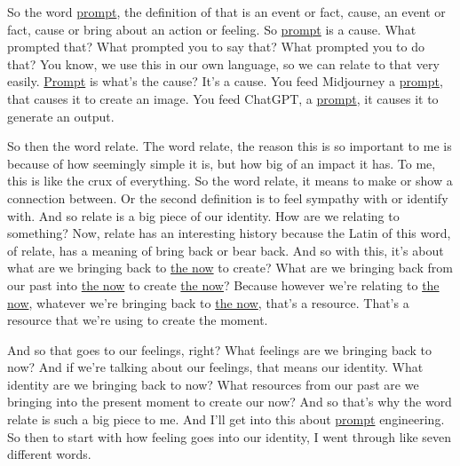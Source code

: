 \documentclass{article}
\begin{document}
So the word \hyperlink{gloss:prompt}{prompt}, the definition of that is an event or fact, cause, an event or fact, cause or bring about an action or feeling. So \hyperlink{gloss:prompt}{prompt} is a cause. What prompted that? What prompted you to say that? What prompted you to do that? You know, we use this in our own language, so we can relate to that very easily. \hyperlink{gloss:prompt}{Prompt} is what's the cause? It's a cause. You feed Midjourney a \hyperlink{gloss:prompt}{prompt}, that causes it to create an image. You feed ChatGPT, a \hyperlink{gloss:prompt}{prompt}, it causes it to generate an output.

So then the word relate. The word relate, the reason this is so important to me is because of how seemingly simple it is, but how big of an impact it has. To me, this is like the crux of everything. So the word relate, it means to make or show a connection between. Or the second definition is to feel sympathy with or identify with. And so relate is a big piece of our identity. How are we relating to something? Now, relate has an interesting history because the Latin of this word, of relate, has a meaning of bring back or bear back. And so with this, it's about what are we bringing back to \hyperlink{gloss:the_now}{the now} to create? What are we bringing back from our past into \hyperlink{gloss:the_now}{the now} to create \hyperlink{gloss:the_now}{the now}? Because however we're relating to \hyperlink{gloss:the_now}{the now}, whatever we're bringing back to \hyperlink{gloss:the_now}{the now}, that's a resource. That's a resource that we're using to create the moment.

And so that goes to our feelings, right? What feelings are we bringing back to now? And if we're talking about our feelings, that means our identity. What identity are we bringing back to now? What resources from our past are we bringing into the present moment to create our now? And so that's why the word relate is such a big piece to me. And I'll get into this about \hyperlink{gloss:prompt}{prompt} engineering. So then to start with how feeling goes into our identity, I went through like seven different words.
\end{document}
